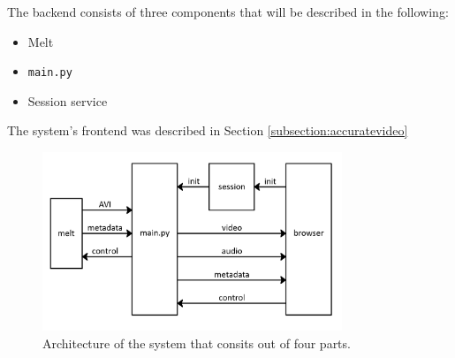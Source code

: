 \documentclass[../MasterThesis.tex]{subfiles}
\begin{document}
%
%

The backend consists of three components that will be described in the following:
\begin{itemize}
	\item Melt
	\item \texttt{main.py}
	\item Session service
\end{itemize}

The system's frontend was described in Section \ref{subsection:accuratevideo}

\begin{figure}[H]
	\centering
	\includegraphics[width=0.8\textwidth]{IM3.png}
	\caption[System architecture]{Architecture of the system that consits out of four parts.}
\end{figure}

%
%
%
\end{document}
